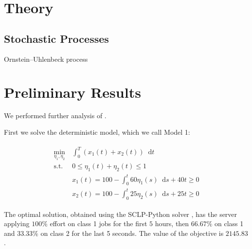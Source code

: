 \documentclass[11pt,a4paper,titlepage]{article}
\newcommand*{\dd}{\ensuremath{\mathop{}\!\mathrm{d}}}%
\theoremstyle{definition}
\theoremstyle{plain}
\begin{document}
\section{Theory}
\label{sec:theory}

\subsection{Stochastic Processes}
\label{subsec:theory:stochastic_processes}

Ornstein–Uhlenbeck process


\section{Preliminary Results}
\label{sec:results}

We performed further analysis of .

\newcommand{\modelone}{Model 1}
\newcommand{\modeltwo}{Model 2}

First we solve the deterministic model,
which we call \modelone:

\begin{align}
\label{eq:model-1}
\begin{split}
    \min\limits_{\eta_1, \eta_2}
        &~ \int_0^T \left( x_1(t) + x_2(t) \right) \dd t \\
    \text{s.t.}
        &~ 0 \leq \eta_1(t) + \eta_2(t) \leq 1 \\
        &~ x_1(t) = 100 - \int_0^t 60 \eta_1(s) \dd s + 40t \geq 0 \\
        &~ x_2(t) = 100 - \int_0^t 25 \eta_2(s) \dd s + 25t \geq 0
\end{split}
\end{align}

The optimal solution,
obtained using the SCLP-Python solver \autocite{Shindin_SCLPPython_2021},
has the server applying $100\%$ effort on class 1 jobs for the first $5$ hours,
then $66.67\%$ on class 1 and 33.33\% on class 2 for the last 5 seconds.
The value of the objective is $2145.83$.
\end{document}
